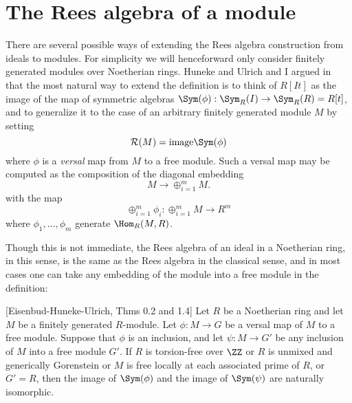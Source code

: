 \documentclass[twoside,12pt, leqno]{amsart}
\def\image{{\rm image}}
\def\RR{{\mathcal R}}
\begin{document}
\section{The Rees algebra of a module} There are several possible ways of extending the Rees algebra construction from ideals to modules. For simplicity we will henceforward only consider finitely generated modules
over Noetherian rings. Huneke and Ulrich and I argued in~\cite{EHU} that the most natural
way to extend the definition is
to think of $R[It]$ as the image of the map of symmetric algebras
$\Sym(\phi): \Sym_R(I) \to \Sym_R(R) = R[t]$, and to generalize it to the case of
an arbitrary finitely generated module $M$ by setting
$$
\RR(M) = \image \Sym(\phi)
$$ 
where $\phi$ is a \emph{versal} map from $M$ to a free module. Such a
versal map may be computed as 
the composition of 
the diagonal 
embedding 
$$
M \to \oplus_{i=1}^mM.
$$
with the map
$$
\oplus_{i=1}^m\phi_i: \oplus_{i=1}^mM \to R^{m}
$$ 
where
$\phi_1,\dots, \phi_m$ generate $\Hom_R(M,R)$.
 

Though this is not immediate, the Rees algebra of an ideal in a Noetherian ring, in this sense,
 is the same as the Rees algebra in the classical sense, and in most cases one can take
 any embedding of the module into a free module in the definition:
 
\begin{theorem}\label{good cases} [Eisenbud-Huneke-Ulrich, Thms 0.2 and 1.4] Let $R$ be a Noetherian ring
     and let $M$ be a finitely generated $R$-module. Let $\phi: M \to G$
     be a versal map of $M$ to a free module. Suppose that $\phi$ is an inclusion, and let
     $\psi: M \to G'$  be any inclusion of $M$ into a free module $G'$. 
     If $R$ is torsion-free over $\ZZ$
     or $R$ is unmixed and generically Gorenstein or $M$ is free locally
     at each associated prime of $R$, or $G'=R$, then the image of $\Sym(\phi)$ and the
     image of $\Sym(\psi)$ are naturally isomorphic.
\end{theorem}
\end{document}
